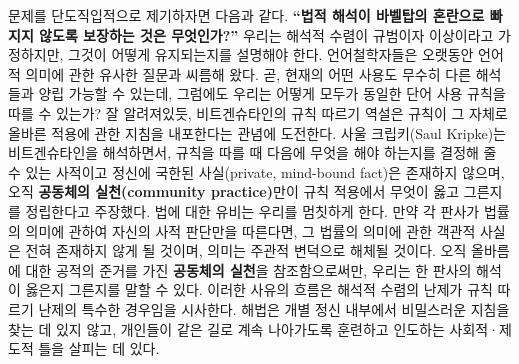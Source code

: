 \documentclass[12pt,a4paper]{article}
\begin{document}
문제를 단도직입적으로 제기하자면 다음과 같다. \textbf{``법적 해석이
바벨탑의 혼란으로 빠지지 않도록 보장하는 것은 무엇인가?''} 우리는 해석적
수렴이 규범이자 이상이라고 가정하지만, 그것이 어떻게 유지되는지를
설명해야 한다. 언어철학자들은 오랫동안 언어적 의미에 관한 유사한 질문과
씨름해 왔다. 곧, 현재의 어떤 사용도 무수히 다른 해석들과 양립 가능할 수
있는데, 그럼에도 우리는 어떻게 모두가 동일한 단어 사용 규칙을 따를 수
있는가? 잘 알려져있듯, 비트겐슈타인의 규칙 따르기 역설은 규칙이 그
자체로 올바른 적용에 관한 지침을 내포한다는 관념에
도전한다\autocite{wittgenstein1953,kripke1982}. 사울 크립키(Saul Kripke)는
비트겐슈타인을 해석하면서, 규칙을 따를 때 다음에 무엇을 해야 하는지를
결정해 줄 수 있는 사적이고 정신에 국한된 사실(private, mind-bound
fact)은 존재하지 않으며, 오직 \textbf{공동체의 실천(community
practice)}만이 규칙 적용에서 무엇이 옳고 그른지를 정립한다고
주장했다\autocite{kripke1982,rulefollowing2022}. 법에 대한 유비는 우리를
멈칫하게 한다. 만약 각 판사가 법률의 의미에 관하여 자신의 사적 판단만을
따른다면, 그 법률의 의미에 관한 객관적 사실은 전혀 존재하지 않게 될
것이며, 의미는 주관적 변덕으로 해체될 것이다. 오직 올바름에 대한 공적의
준거를 가진 \textbf{공동체의 실천}을 참조함으로써만, 우리는 한 판사의
해석이 \textsf{옳은지 그른지}를 말할 수 있다. 이러한 사유의 흐름은 해석적
수렴의 난제가 규칙 따르기 난제의 특수한 경우임을 시사한다. 해법은 개별
정신 내부에서 비밀스러운 지침을 찾는 데 있지 않고, 개인들이 \textsf{같은
길로 계속 나아가도록} 훈련하고 인도하는 사회적·제도적 틀을 살피는 데
있다.
\end{document}
